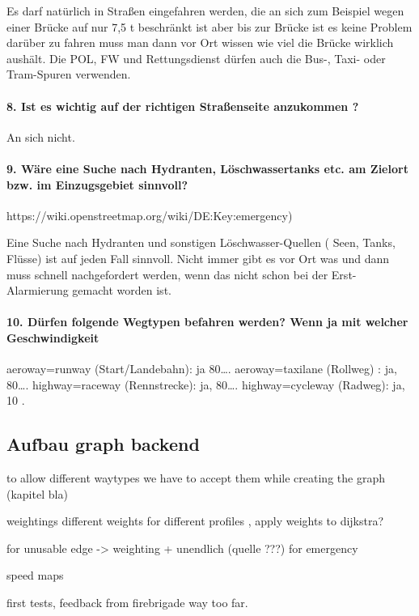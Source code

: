 \documentclass[12pt,a4paper]{article}
\begin{document}
Es darf natürlich in Straßen eingefahren werden, die an sich zum Beispiel wegen einer Brücke auf nur 7,5 t beschränkt ist aber bis zur Brücke ist es keine Problem darüber zu fahren muss man dann vor Ort wissen wie viel die Brücke wirklich aushält.
Die POL, FW und Rettungsdienst dürfen auch die Bus-, Taxi- oder Tram-Spuren verwenden.

\paragraph*{8. Ist es wichtig auf der richtigen Straßenseite anzukommen ?}

An sich nicht.

\paragraph*{9. Wäre eine Suche nach Hydranten, Löschwassertanks etc. am Zielort bzw. im Einzugsgebiet sinnvoll?}

https://wiki.openstreetmap.org/wiki/DE:Key:emergency)

Eine Suche nach Hydranten und sonstigen Löschwasser-Quellen ( Seen, Tanks, Flüsse) ist auf jeden Fall sinnvoll. Nicht immer gibt es vor Ort was und dann muss schnell nachgefordert werden, wenn das nicht schon bei der Erst-Alarmierung gemacht worden ist.

\paragraph*{10. Dürfen folgende Wegtypen befahren werden? Wenn ja mit welcher Geschwindigkeit}

aeroway=runway (Start/Landebahn): ja 80….
aeroway=taxilane (Rollweg) : ja, 80….
highway=raceway (Rennstrecke): ja, 80….
highway=cycleway (Radweg): ja, 10 .


\subsection{Aufbau graph backend}
\label{backendGraphBuild}

to allow different waytypes we have to accept them while creating the graph (kapitel bla)

weightings 
 different weights for different profiles , apply weights to dijkstra?
 
 for unusable edge -> weighting + unendlich (quelle ???)
 for emergency 
 
speed maps

first tests, feedback from firebrigade
way too far.
\end{document}
